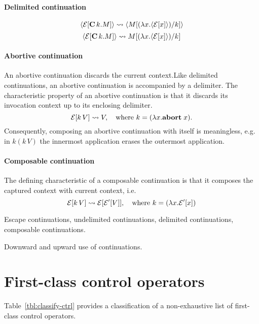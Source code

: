 \documentclass[12pt,phd,lfcs,twoside,openright,logo,leftchapter,normalheadings]{infthesis}
\theoremstyle{plain}
\theoremstyle{definition}
\begin{document}
\paragraph{Delimited continuation}
%
\[
  \langle\mathcal{E}[\mathbf{C}\,k.M]\rangle \leadsto \langle M[(\lambda x.\langle\mathcal{E}[x]\rangle)/k]\rangle
\]
%
\[
  \langle\mathcal{E}[\mathbf{C}\,k.M]\rangle \leadsto M[(\lambda x.\langle\mathcal{E}[x]\rangle)/k]
\]

\paragraph{Abortive continuation} An abortive continuation discards the current context.Like delimited continuations, an
abortive continuation is accompanied by a delimiter. The
characteristic property of an abortive continuation is that it
discards its invocation context up to its enclosing delimiter.
%
\[
  \mathcal{E}[k\,V] \leadsto V, \quad \text{where } k = (\lambda x. \mathbf{abort}\;x).
\]
%
Consequently, composing an abortive continuation with itself is
meaningless, e.g. in $k (k\,V)$ the innermost application erases the
outermost application.

\paragraph{Composable continuation} The defining characteristic of a
composable continuation is that it composes the captured context with
current context, i.e.
%
\[
  \mathcal{E}[k\,V] \leadsto \mathcal{E}[\mathcal{E}'[V]], \quad \text{where } k = (\lambda x. \mathcal{E}'[x])
\]

Escape continuations, undelimited continuations, delimited
continuations, composable continuations.

Downward and upward use of continuations.

\section{First-class control operators}
Table~\ref{tbl:classify-ctrl} provides a classification of a
non-exhaustive list of first-class control operators.
\end{document}
